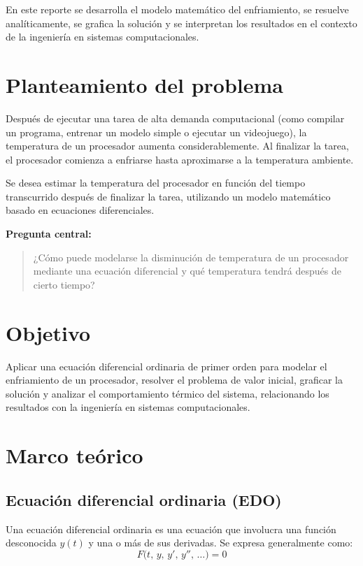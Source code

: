 \documentclass[12pt,a4paper]{article}
\begin{document}
En este reporte se desarrolla el modelo matemático del enfriamiento, se resuelve analíticamente, se grafica la solución y se interpretan los resultados en el contexto de la ingeniería en sistemas computacionales.

\section{Planteamiento del problema}

Después de ejecutar una tarea de alta demanda computacional (como compilar un programa, entrenar un modelo simple o ejecutar un videojuego), la temperatura de un procesador aumenta considerablemente. Al finalizar la tarea, el procesador comienza a enfriarse hasta aproximarse a la temperatura ambiente.

Se desea estimar la temperatura del procesador en función del tiempo transcurrido después de finalizar la tarea, utilizando un modelo matemático basado en ecuaciones diferenciales.

\textbf{Pregunta central:}
\begin{quote}
¿Cómo puede modelarse la disminución de temperatura de un procesador mediante una ecuación diferencial y qué temperatura tendrá después de cierto tiempo?
\end{quote}

\section{Objetivo}

Aplicar una ecuación diferencial ordinaria de primer orden para modelar el enfriamiento de un procesador, resolver el problema de valor inicial, graficar la solución y analizar el comportamiento térmico del sistema, relacionando los resultados con la ingeniería en sistemas computacionales.

\section{Marco teórico}

\subsection{Ecuación diferencial ordinaria (EDO)}

Una ecuación diferencial ordinaria es una ecuación que involucra una función desconocida \(y(t)\) y una o más de sus derivadas. Se expresa generalmente como:
\[
F\bigl(t,\,y,\,y',\,y'',\,\dots\bigr)=0
\]
\end{document}
